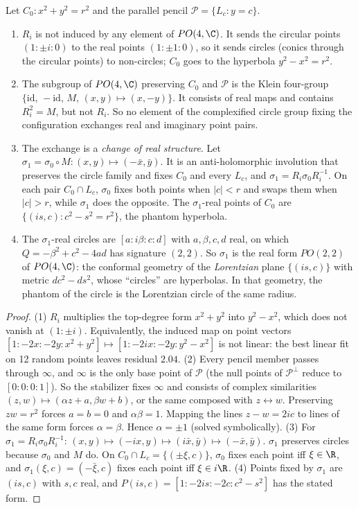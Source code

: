 \begin{theorem}\label{thm:inv}
Let $C_0:x^2+y^2=r^2$ and the parallel pencil $\mathcal{P}=\{L_c:y=c\}$.
\begin{enumerate}
\item $R_i$ is not induced by any element of $PO(4,\C)$. It sends the circular points $(1:\pm i:0)$ to the real points $(1:\pm1:0)$, so it sends circles (conics through the circular points) to non-circles; $C_0$ goes to the hyperbola $y^2-x^2=r^2$.
\item The subgroup of $PO(4,\C)$ preserving $C_0$ and $\mathcal{P}$ is the Klein four-group $\{\mathrm{id},\,-\mathrm{id},\,M,\,(x,y)\mapsto(x,-y)\}$. It consists of real maps and contains $R_i^2=M$, but not $R_i$. So no element of the complexified circle group fixing the configuration exchanges real and imaginary point pairs.
\item The exchange is a \emph{change of real structure}. Let $\sigma_1=\sigma_0\circ M:(x,y)\mapsto(-\bar x,\bar y)$. It is an anti-holomorphic involution that preserves the circle family and fixes $C_0$ and every $L_c$, and $\sigma_1=R_i\sigma_0R_i^{-1}$. On each pair $C_0\cap L_c$, $\sigma_0$ fixes both points when $|c|<r$ and swaps them when $|c|>r$, while $\sigma_1$ does the opposite. The $\sigma_1$-real points of $C_0$ are $\{(is,c):c^2-s^2=r^2\}$, the phantom hyperbola.
\item The $\sigma_1$-real circles are $[a:i\beta:c:d]$ with $a,\beta,c,d$ real, on which $Q=-\beta^2+c^2-4ad$ has signature $(2,2)$. So $\sigma_1$ is the real form $PO(2,2)$ of $PO(4,\C)$: the conformal geometry of the \emph{Lorentzian} plane $\{(is,c)\}$ with metric $dc^2-ds^2$, whose ``circles'' are hyperbolas. In that geometry, the phantom of the circle is the Lorentzian circle of the same radius.
\end{enumerate}
\end{theorem}
\begin{proof}
(1) $R_i$ multiplies the top-degree form $x^2+y^2$ into $y^2-x^2$, which does not vanish at $(1:\pm i)$. Equivalently, the induced map on point vectors $[1:-2x:-2y:x^2+y^2]\mapsto[1:-2ix:-2y:y^2-x^2]$ is not linear: the best linear fit on 12 random points leaves residual $2.04$.
(2) Every pencil member passes through $\infty$, and $\infty$ is the only base point of $\mathcal{P}$ (the null points of $\mathcal{P}^\perp$ reduce to $[0:0:0:1]$). So the stabilizer fixes $\infty$ and consists of complex similarities $(z,w)\mapsto(\alpha z+a,\beta w+b)$, or the same composed with $z\leftrightarrow w$. Preserving $zw=r^2$ forces $a=b=0$ and $\alpha\beta=1$. Mapping the lines $z-w=2ic$ to lines of the same form forces $\alpha=\beta$. Hence $\alpha=\pm1$ (solved symbolically).
(3) For $\sigma_1=R_i\sigma_0R_i^{-1}$: $(x,y)\mapsto(-ix,y)\mapsto(i\bar x,\bar y)\mapsto(-\bar x,\bar y)$. $\sigma_1$ preserves circles because $\sigma_0$ and $M$ do. On $C_0\cap L_c=\{(\pm\xi,c)\}$, $\sigma_0$ fixes each point iff $\xi\in\R$, and $\sigma_1(\xi,c)=(-\bar\xi,c)$ fixes each point iff $\xi\in i\R$.
(4) Points fixed by $\sigma_1$ are $(is,c)$ with $s,c$ real, and $P(is,c)=[1:-2is:-2c:c^2-s^2]$ has the stated form.
\end{proof}

